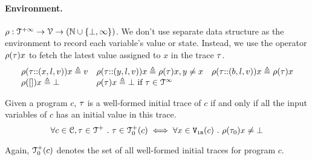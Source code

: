%
\paragraph{Environment.} $\rho : {\mathcal{T}^{+\infty}}  \to \mathcal{V} \to(\mathbb{N} \cup \{\bot, \infty\})$.  
We don't use separate data structure as the environment to record each variable's value or state. Instead, we use the operator $\rho (\mathtt{\tau}) x$ to fetch the latest value assigned to $x$ in the trace $\mathtt{\tau}$. 
\[
\begin{array}{lll}
\rho(\mathtt{\tau}  {\small ::} (x, l, v)) x \triangleq v
&
\rho(\mathtt{\tau} {\small ::} (y, l, v)) x \triangleq \rho(\mathtt{\tau}) x, y \neq x
&
\rho(\mathtt{\tau} {\small ::} (b, l, v)) x \triangleq \rho(\mathtt{\tau}) x
\\
\rho({[]} ) x \triangleq \bot
&
\rho(\mathtt{\tau} ) x \triangleq \bot ~ \text{if}~ \mathtt{\tau} \in \mathcal{T}^{\infty}
\end{array}
\]
%
\begin{defn}
  \label{def:initial_trace}
  Given a program $c$, $\mathtt{\tau}$ is a well-formed initial trace of $c$ if and only if all the input variables of $c$ has an initial value in this trace.
  \[
    \forall c \in \mathcal{C}, \mathtt{\tau} \in \mathcal{T}^{+} ~.~ \mathtt{\tau} \in \mathcal{T}^{+}_0(c) \iff 
    \forall x \in {\ensuremath{\mathtt{V_{\mathtt{in}}}}}(c) ~.~ \rho(\mathtt{\tau}_0) x \neq \bot
    \]
\end{defn}
%
Again, $\mathcal{T}^{+}_0(c)$ denotes the set of all well-formed initial traces for program $c$.
%
